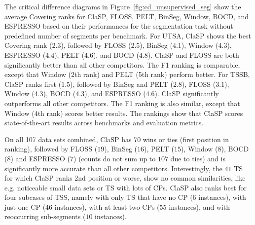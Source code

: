 \documentclass[pdflatex,sn-basic]{sn-jnl}
\begin{document}
The critical difference diagrams in Figure~\ref{fig:cd_unsupervised_seg} show the average Covering ranks for ClaSP, FLOSS, PELT, BinSeg, Window, BOCD, and ESPRESSO based on their performances for the segmentation task without predefined number of segments per benchmark. For UTSA, ClaSP shows the best Covering rank (2.3), followed by FLOSS (2.5), BinSeg (4.1), Window (4.3), ESPRESSO (4.4), PELT (4.6), and BOCD (4.8). ClaSP and FLOSS are both significantly better than all other competitors. The F1 ranking is comparable, except that Window (2th rank) and PELT (5th rank) perform better. For TSSB, ClaSP ranks first (1.5), followed by BinSeg and PELT (2.8), FLOSS (3.1), Window (4.3), BOCD (4.3), and ESPRESSO (4.6). ClaSP significantly outperforms all other competitors. The F1 ranking is also similar, except that Window (4th rank) scores better results. The rankings show that ClaSP scores state-of-the-art results across benchmarks and evaluation metrics.

On all 107 data sets combined, ClaSP has $70$ wins or ties (first position in ranking), followed by FLOSS ($19$), BinSeg ($16$), PELT ($15$), Window ($8$), BOCD ($8$) and ESPRESSO ($7$) (counts do not sum up to $107$ due to ties) and is significantly more accurate than all other competitors. Interestingly, the $41$ TS for which ClaSP ranks 2nd position or worse, show no common similarities, like e.g. noticeable small data sets or TS with lots of CPs. ClaSP also ranks best for four subcases of TSS, namely with only TS that have no CP ($6$ instances), with just one CP ($46$ instances), with at least two CPs ($55$ instances), and with reoccurring sub-segments ($10$ instances).
\end{document}
